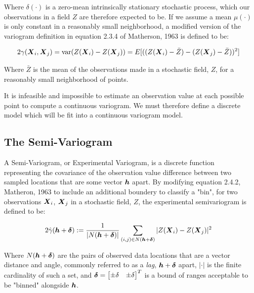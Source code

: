 \documentclass[11pt]{ucthesis}
\newcommand{\vect}[1]{{\it{\boldsymbol{#1}}}}
\begin{document}
Where $\delta(\cdot)$ is a zero-mean intrinsically stationary stochastic process, which our observations in a field $Z$ are therefore expected to be. If we assume a mean $\mu(\cdot)$ is only constant in a reasonably small neighborhood, a modified version of the variogram definition in equation 2.3.4 of Matherson, 1963 \cite{matheron:geostat} is defined to be:

\begin{equation}
	2\gamma(\vect{X}_i, \vect{X}_j)= \text{var} (Z(\vect{X}_{i}) - Z(\vect{X}_{j}))=E[( (Z(\vect{X}_{i}) - \bar{Z} ) - (Z(\vect{X}_{j}) - \bar{Z} ))^2]
    \label{eq:cont_var}
\end{equation}

Where $\bar{Z}$ is the mean of the observations made in a stochastic field, $Z$, for a reasonably small neighborhood of points.

It is infeasible and impossible to estimate an observation value at each possible point to compute a continuous variogram. We must therefore define a discrete model which will be fit into a continuous variogram model.

\subsection{The Semi-Variogram}
A Semi-Variogram, or Experimental Variogram, is a discrete function representing the covariance of the observation value difference between two sampled locations that are some vector $\vect{h}$ apart. By modifying equation 2.4.2, Matheron, 1963 \cite{matheron:geostat} to include an additional boundery to classify a "bin", for two observations $\vect{X}_{i}$, $\vect{X}_{j}$ in a stochastic field, $Z$, the experimental semivariogram is defined to be:

\begin{equation} 
    \label{eq:exp_var}
    2\hat{\gamma}(\vect{h}+\vect{\delta}) := \frac{1}{|N(\vect{h}+\vect{\delta})|}\sum\limits_{(i,j)\in N(\vect{h}+\vect{\delta})}|Z(\vect{X}_i) - Z(\vect{X}_j)|^2 %
\end{equation}

Where $N(\vect{h}+\vect{\delta})$ are the pairs of observed data locations that are a vector distance and angle, commonly referred to as a \textit{lag}, $\vect{h}+\vect{\delta}$ apart, $|\cdot|$ is the finite cardinality of such a set, and $\vect{\delta} = \begin{bmatrix}\pm\delta & \pm\delta\end{bmatrix}^{T}$ is a bound of ranges acceptable to be "binned" alongside $\vect{h}$.
\end{document}
